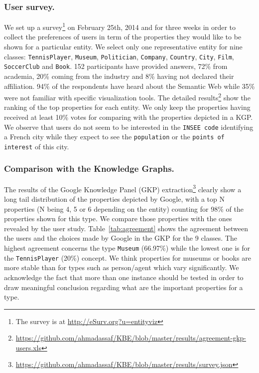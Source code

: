 \subsubsection{User survey.}
\label{sec:survey}
We set up a survey\footnote{The survey is at \url{http://eSurv.org?u=entityviz}} on February 25th, 2014 and for three weeks in order to collect the preferences of users in term of the properties they would like to be shown for a particular entity. We select only one representative entity for nine classes: \texttt{TennisPlayer}, \texttt{Museum}, \texttt{Politician}, \texttt{Company}, \texttt{Country}, \texttt{City}, \texttt{Film}, \texttt{SoccerClub} and \texttt{Book}. 152 participants have provided answers, 72\% from academia, 20\% coming from the industry and 8\% having not declared their affiliation. 94\% of the respondents have heard about the Semantic Web while 35\% were not familiar with specific visualization tools. The detailed results\footnote{\url{https://github.com/ahmadassaf/KBE/blob/master/results/agreement-gkp-users.xls}} show the ranking of the top properties for each entity. We only keep the properties having received at least 10\% votes for comparing with the properties depicted in a KGP. We observe that users do not seem to be interested in the \texttt{INSEE code} identifying a French city while they expect to see the \texttt{population} or the \texttt{points of interest} of this city.

\subsubsection{Comparison with the Knowledge Graphs.}
\label{sec:comparison}
The results of the Google Knowledge Panel (GKP) extraction\footnote{\url{https://github.com/ahmadassaf/KBE/blob/master/results/survey.json}} clearly show a long tail distribution of the properties depicted by Google, with a top N properties (N being 4, 5 or 6 depending on the entity) counting for 98\% of the properties shown for this type. We compare those properties with the ones revealed by the user study. Table~\ref{tab:agreement} shows the agreement between the users and the choices made by Google in the GKP for the 9 classes. The highest agreement concerns the type \texttt{Museum} (66.97\%) while the lowest one is for the \texttt{TennisPlayer} (20\%) concept. We think properties for museums or books are more stable than for types such as person/agent which vary significantly. We acknowledge the fact that more than one instance should be tested in order to draw meaningful conclusion regarding what are the important properties for a type.

